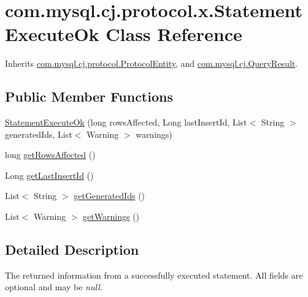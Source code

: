 \hypertarget{classcom_1_1mysql_1_1cj_1_1protocol_1_1x_1_1_statement_execute_ok}{}\section{com.\+mysql.\+cj.\+protocol.\+x.\+Statement\+Execute\+Ok Class Reference}
\label{classcom_1_1mysql_1_1cj_1_1protocol_1_1x_1_1_statement_execute_ok}


Inherits \mbox{\hyperlink{interfacecom_1_1mysql_1_1cj_1_1protocol_1_1_protocol_entity}{com.\+mysql.\+cj.\+protocol.\+Protocol\+Entity}}, and \mbox{\hyperlink{interfacecom_1_1mysql_1_1cj_1_1_query_result}{com.\+mysql.\+cj.\+Query\+Result}}.

\subsection*{Public Member Functions}
\begin{DoxyCompactItemize}
\item 
\mbox{\hyperlink{classcom_1_1mysql_1_1cj_1_1protocol_1_1x_1_1_statement_execute_ok_a7faa77141adbd06b55260f601712e99e}{Statement\+Execute\+Ok}} (long rows\+Affected, Long last\+Insert\+Id, List$<$ String $>$ generated\+Ids, List$<$ Warning $>$ warnings)
\item 
long \mbox{\hyperlink{classcom_1_1mysql_1_1cj_1_1protocol_1_1x_1_1_statement_execute_ok_afa0c398b51fe0eec732949c8ef906be7}{get\+Rows\+Affected}} ()
\item 
Long \mbox{\hyperlink{classcom_1_1mysql_1_1cj_1_1protocol_1_1x_1_1_statement_execute_ok_af13aefa68528663f6b90549175eaacca}{get\+Last\+Insert\+Id}} ()
\item 
List$<$ String $>$ \mbox{\hyperlink{classcom_1_1mysql_1_1cj_1_1protocol_1_1x_1_1_statement_execute_ok_aa751937b760b98e2ce530700d11c70c3}{get\+Generated\+Ids}} ()
\item 
List$<$ Warning $>$ \mbox{\hyperlink{classcom_1_1mysql_1_1cj_1_1protocol_1_1x_1_1_statement_execute_ok_af4bf2c7891fad1f93648b30d7c3829c2}{get\+Warnings}} ()
\end{DoxyCompactItemize}


\subsection{Detailed Description}
The returned information from a successfully executed statement. All fields are optional and may be {\itshape null}. 

